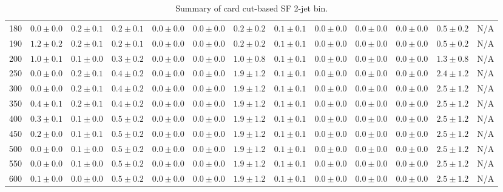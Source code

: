 \begin{table}
{\begin{center}
\begin{tabular}{l | c c | c c c c c c c c  | c c}
180 & $0.0\pm0.0$ & $0.2\pm0.1$ & $0.2\pm0.1$ & $0.0\pm0.0$ & $0.0\pm0.0$ & $0.2\pm0.2$ & $0.1\pm0.1$ & $0.0\pm0.0$ & $0.0\pm0.0$ & $0.0\pm0.0$ & $0.5\pm0.2$ & N/A \\
190 & $1.2\pm0.2$ & $0.2\pm0.1$ & $0.2\pm0.1$ & $0.0\pm0.0$ & $0.0\pm0.0$ & $0.2\pm0.2$ & $0.1\pm0.1$ & $0.0\pm0.0$ & $0.0\pm0.0$ & $0.0\pm0.0$ & $0.5\pm0.2$ & N/A \\
200 & $1.0\pm0.1$ & $0.1\pm0.0$ & $0.3\pm0.2$ & $0.0\pm0.0$ & $0.0\pm0.0$ & $1.0\pm0.8$ & $0.1\pm0.1$ & $0.0\pm0.0$ & $0.0\pm0.0$ & $0.0\pm0.0$ & $1.3\pm0.8$ & N/A \\
250 & $0.0\pm0.0$ & $0.2\pm0.1$ & $0.4\pm0.2$ & $0.0\pm0.0$ & $0.0\pm0.0$ & $1.9\pm1.2$ & $0.1\pm0.1$ & $0.0\pm0.0$ & $0.0\pm0.0$ & $0.0\pm0.0$ & $2.4\pm1.2$ & N/A \\
300 & $0.0\pm0.0$ & $0.2\pm0.1$ & $0.4\pm0.2$ & $0.0\pm0.0$ & $0.0\pm0.0$ & $1.9\pm1.2$ & $0.1\pm0.1$ & $0.0\pm0.0$ & $0.0\pm0.0$ & $0.0\pm0.0$ & $2.5\pm1.2$ & N/A \\
350 & $0.4\pm0.1$ & $0.2\pm0.1$ & $0.4\pm0.2$ & $0.0\pm0.0$ & $0.0\pm0.0$ & $1.9\pm1.2$ & $0.1\pm0.1$ & $0.0\pm0.0$ & $0.0\pm0.0$ & $0.0\pm0.0$ & $2.5\pm1.2$ & N/A \\
400 & $0.3\pm0.1$ & $0.1\pm0.0$ & $0.5\pm0.2$ & $0.0\pm0.0$ & $0.0\pm0.0$ & $1.9\pm1.2$ & $0.1\pm0.1$ & $0.0\pm0.0$ & $0.0\pm0.0$ & $0.0\pm0.0$ & $2.5\pm1.2$ & N/A \\
450 & $0.2\pm0.0$ & $0.1\pm0.1$ & $0.5\pm0.2$ & $0.0\pm0.0$ & $0.0\pm0.0$ & $1.9\pm1.2$ & $0.1\pm0.1$ & $0.0\pm0.0$ & $0.0\pm0.0$ & $0.0\pm0.0$ & $2.5\pm1.2$ & N/A \\
500 & $0.0\pm0.0$ & $0.1\pm0.0$ & $0.5\pm0.2$ & $0.0\pm0.0$ & $0.0\pm0.0$ & $1.9\pm1.2$ & $0.1\pm0.1$ & $0.0\pm0.0$ & $0.0\pm0.0$ & $0.0\pm0.0$ & $2.5\pm1.2$ & N/A \\
550 & $0.0\pm0.0$ & $0.1\pm0.0$ & $0.5\pm0.2$ & $0.0\pm0.0$ & $0.0\pm0.0$ & $1.9\pm1.2$ & $0.1\pm0.1$ & $0.0\pm0.0$ & $0.0\pm0.0$ & $0.0\pm0.0$ & $2.5\pm1.2$ & N/A \\
600 & $0.1\pm0.0$ & $0.0\pm0.0$ & $0.5\pm0.2$ & $0.0\pm0.0$ & $0.0\pm0.0$ & $1.9\pm1.2$ & $0.1\pm0.1$ & $0.0\pm0.0$ & $0.0\pm0.0$ & $0.0\pm0.0$ & $2.5\pm1.2$ & N/A \\
\hline
\end{tabular}
\end{center}
}
\caption{Summary of card cut-based SF 2-jet bin.}
\end{table}
